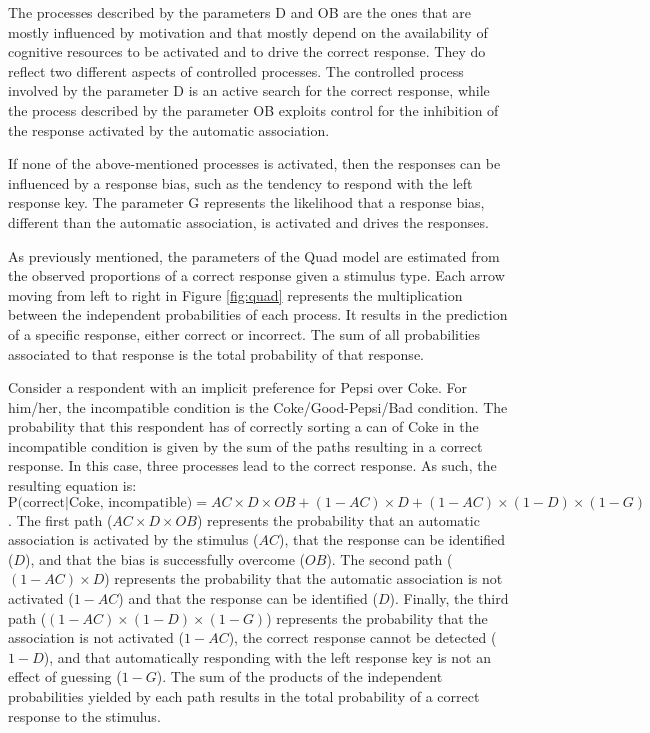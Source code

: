 \documentclass[12pt]{book}
\begin{document}
The processes described by the parameters D and OB are the ones that are mostly influenced by motivation and that mostly depend on the availability of cognitive resources  to be activated and to drive the correct response. They do reflect two different aspects of controlled processes. The controlled process involved by the parameter D is an active search for the correct response, while the process described by the parameter OB  exploits control for the inhibition of the response activated by the automatic association. 

If none of the above-mentioned processes is activated, then the responses can be influenced by a response bias, such as the tendency to respond with the left response key. The parameter G represents the likelihood that a response bias, different than the automatic association, is activated and drives the responses. 

As previously mentioned, the parameters of the Quad model are estimated from the observed proportions of a correct response given a stimulus type. Each arrow moving from left to right in Figure \ref{fig:quad} represents the multiplication between the independent probabilities of each process. It results in the prediction of a specific response, either correct or incorrect. 
The sum of all probabilities associated to that response is the total probability of that response.

Consider a respondent with an implicit preference for Pepsi over Coke. For him/her, the incompatible condition is the Coke/Good-Pepsi/Bad condition. The probability that this respondent has of correctly sorting a can of Coke in the incompatible condition is given by the sum of the paths resulting in a correct response. In this case, three processes lead to the correct response. As such, the resulting equation is: $\text{P(correct}|\text{Coke, incompatible)} = AC \times D \times OB + (1-AC)\times D + (1-AC)\times (1-D) \times (1-G)$. 
The first path ($AC \times D \times OB$) represents the probability that an automatic association is activated by the stimulus ($AC$), that the response can be identified ($D$), and that the bias is successfully overcome ($OB$).
The second path  ($(1-AC)\times D$) represents the probability that the automatic association is not activated ($1 - AC$) and that the response can be identified ($D$). 
Finally, the third path ($(1-AC)\times (1-D) \times (1-G)$) represents the probability that the association is not activated ($1-AC$), the correct response cannot be detected ($1-D$), and that automatically responding with the left response key is not an effect of guessing ($1-G$).
The sum of the products of the independent probabilities yielded by each path results in the total probability of a correct response to the stimulus.
\end{document}
